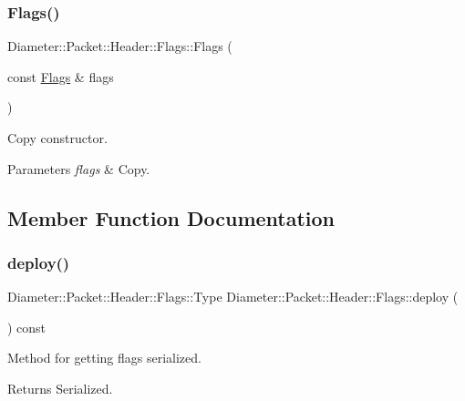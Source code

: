 \subsubsection{\texorpdfstring{Flags()}{Flags()}\hspace{0.1cm}{\footnotesize\ttfamily [3/3]}}
{\footnotesize\ttfamily Diameter\+::\+Packet\+::\+Header\+::\+Flags\+::\+Flags (\begin{DoxyParamCaption}\item[{const \hyperlink{classDiameter_1_1Packet_1_1Header_1_1Flags}{Flags} \&}]{flags }\end{DoxyParamCaption})}



Copy constructor. 


\begin{DoxyParams}{Parameters}
{\em flags} & Copy. \\
\hline
\end{DoxyParams}


\subsection{Member Function Documentation}
\mbox{\label{classDiameter_1_1Packet_1_1Header_1_1Flags_a6bb796dff7f3e8f128262fb2d3a549bb}} 
\subsubsection{\texorpdfstring{deploy()}{deploy()}}
{\footnotesize\ttfamily Diameter\+::\+Packet\+::\+Header\+::\+Flags\+::\+Type Diameter\+::\+Packet\+::\+Header\+::\+Flags\+::deploy (\begin{DoxyParamCaption}{ }\end{DoxyParamCaption}) const}



Method for getting flags serialized. 

\begin{DoxyReturn}{Returns}
Serialized. 
\end{DoxyReturn}
\mbox{\label{classDiameter_1_1Packet_1_1Header_1_1Flags_ab473570b7a14705c03786b816443e937}} 
